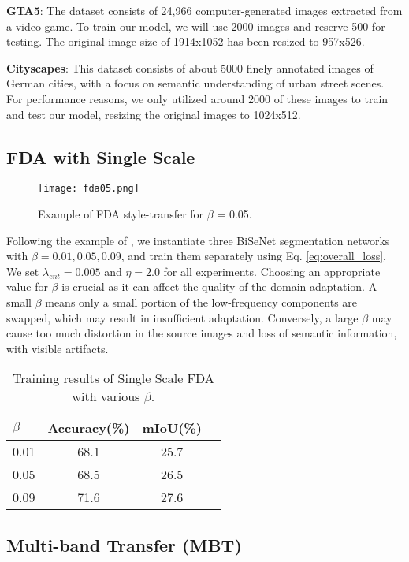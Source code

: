 \documentclass[10pt,twocolumn,letterpaper]{article}
\begin{document}
\textbf{GTA5}: The dataset consists of 24,966 computer-generated images extracted from a video game. To train our model, we will use 2000 images and reserve 500 for testing. The original image size of 1914x1052 has been resized to 957x526.

\textbf{Cityscapes}: This dataset consists of about 5000 finely annotated images of German cities, with a focus on semantic understanding of urban street scenes. For performance reasons, we only utilized around 2000 of these images to train and test our model, resizing the original images to 1024x512.

\subsection{FDA with Single Scale}

\begin{figure}[h]
    \centering
    \texttt{[image: fda05.png]}
    \caption{Example of FDA style-transfer for $\beta$ = 0.05.}
    \label{fig:fdastyle}
\end{figure}

Following the example of \cite{fda}, we instantiate three BiSeNet segmentation networks with $\beta = 0.01, 0.05, 0.09$, and train them separately using Eq. \eqref{eq:overall_loss}. We set $\lambda_{ent} = 0.005$ and $\eta = 2.0$ for all experiments.
Choosing an appropriate value for $\beta$ is crucial as it can affect the quality of the domain adaptation. A small $\beta$ means only a small portion of the low-frequency components are swapped, which may result in insufficient adaptation. Conversely, a large $\beta$ may cause too much distortion in the source images and loss of semantic information, with visible artifacts.

\begin{table}[]
    \centering
    \begin{tabular}{@{}lccc@{}}
    \toprule
    $\beta$ & Accuracy(\%) & mIoU(\%) \\
    \midrule
        0.01 & 68.1 & 25.7 \\
        0.05 & 68.5 & 26.5 \\
        0.09 & 71.6 & 27.6 \\
        \bottomrule
    \end{tabular}
    \caption{Training results of Single Scale FDA with various $\beta$.}
    \label{tab:fda_single_scale}
\end{table}

\subsection{Multi-band Transfer (MBT)}
\end{document}
